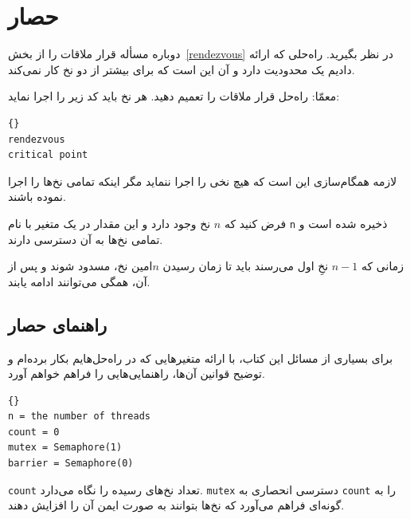 \documentclass{book}
\newcommand{\clearemptydoublepage}{\newpage\cleardoublepage}
\begin{document}
\section{حصار}

    دوباره مسأله قرار ملاقات را از بخش~\ref{rendezvous} در نظر بگیرید. 
    راه‌حلی که ارائه دادیم یک محدودیت دارد و آن این است که برای بیشتر از دو نخ کار نمی‌کند. 

    معمّا: راه‌حل قرار ملاقات را تعمیم دهید. هر نخ باید کد زیر را اجرا نماید:
\begin{latin}
\begin{lstlisting}[title=\rl{ کد حصار}]{}
rendezvous
critical point
\end{lstlisting}
\end{latin}

    لازمه همگام‌سازی این است که هیچ نخی  را اجرا ننماید مگر اینکه تمامی نخ‌ها 
    را اجرا نموده باشند. 

    فرض کنید که $n$ نخ وجود دارد و این مقدار در یک متغیر با نام \texttt{n} ذخیره  شده است و تمامی نخ‌ها به آن دسترسی دارند. 

    زمانی که $n-1$ نخِ اول می‌رسند باید تا زمان رسیدن $n$‌امین نخ، مسدود شوند و پس از آن، همگی می‌توانند ادامه یابند. 


\clearemptydoublepage
\subsection {راهنمای حصار}


    برای بسیاری از مسائل این کتاب، با ارائه متغیرهایی که در راه‌حل‌هایم  بکار برده‌ام و توضیح قوانین آن‌ها، راهنمایی‌هایی را فراهم خواهم آورد. 

\begin{latin}
\begin{lstlisting}[title=\rl{راهنمای حصار}]{}
n = the number of threads
count = 0
mutex = Semaphore(1)
barrier = Semaphore(0)
\end{lstlisting}
\end{latin}

    \texttt{count} تعداد نخ‌های رسیده را نگاه می‌دارد. 
    \texttt{mutex} دسترسی انحصاری به \texttt{count} را 
    به گونه‌ای فراهم می‌آورد که نخ‌ها بتوانند به صورت ایمن آن را افزایش دهند. 
\end{document}
